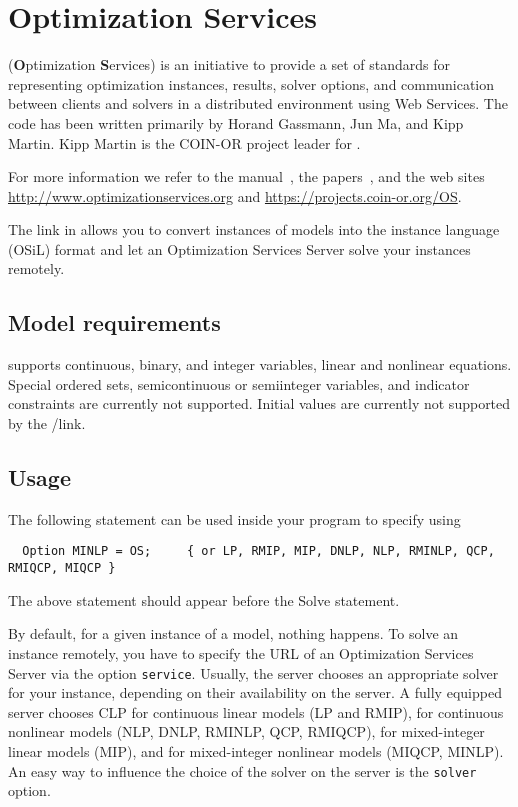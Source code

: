 

\section{Optimization Services}

\OS (\textbf{O}ptimization \textbf{S}ervices) is an initiative to provide a set of standards for representing optimization instances, results, solver options, and communication between clients and solvers in a distributed environment using Web Services.
The code has been written primarily by Horand Gassmann, Jun Ma, and Kipp Martin.
Kipp Martin is the COIN-OR project leader for \OS.

For more information we refer to the \OS manual~\cite{Ma2005}, the papers~\cite{FourerMaMartin2009,FourerMaMartin2010,OSManual}, and the web sites \url{http://www.optimizationservices.org} and \url{https://projects.coin-or.org/OS}.

The \OS link in \GAMS allows you to convert instances of \GAMS models into the \OS instance language (OSiL) format and let an Optimization Services Server solve your instances remotely.

\subsection{Model requirements}

\OS supports continuous, binary, and integer variables, linear and nonlinear equations.
Special ordered sets, semicontinuous or semiinteger variables, and indicator constraints are currently not supported.
Initial values are currently not supported by the \GAMS/\OS link.

\subsection{Usage}

The following statement can be used inside your \GAMS program to specify using \OS
\begin{verbatim}
  Option MINLP = OS;     { or LP, RMIP, MIP, DNLP, NLP, RMINLP, QCP, RMIQCP, MIQCP }
\end{verbatim}

The above statement should appear before the Solve statement.

By default, for a given instance of a \GAMS model, nothing happens.
To solve an instance remotely, you have to specify the URL of an Optimization Services Server via the option \texttt{service}.
Usually, the server chooses an appropriate solver for your instance, depending on their availability on the server.
A fully equipped server chooses
\textsc{CLP} for continuous linear models (LP and RMIP),
\IPOPT for continuous nonlinear models (NLP, DNLP, RMINLP, QCP, RMIQCP),
\CBC for mixed-integer linear models (MIP), and
\BONMIN for mixed-integer nonlinear models (MIQCP, MINLP).
An easy way to influence the choice of the solver on the server is the \texttt{solver} option.

